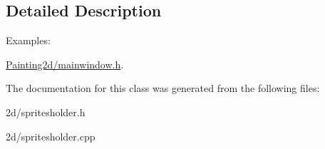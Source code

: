 \subsection{Detailed Description}
\begin{Desc}
\item[Examples\+: ]\par
\hyperlink{_painting2d_2mainwindow_8h-example}{Painting2d/mainwindow.\+h}.\end{Desc}


The documentation for this class was generated from the following files\+:\begin{DoxyCompactItemize}
\item 
2d/spritesholder.\+h\item 
2d/spritesholder.\+cpp\end{DoxyCompactItemize}
